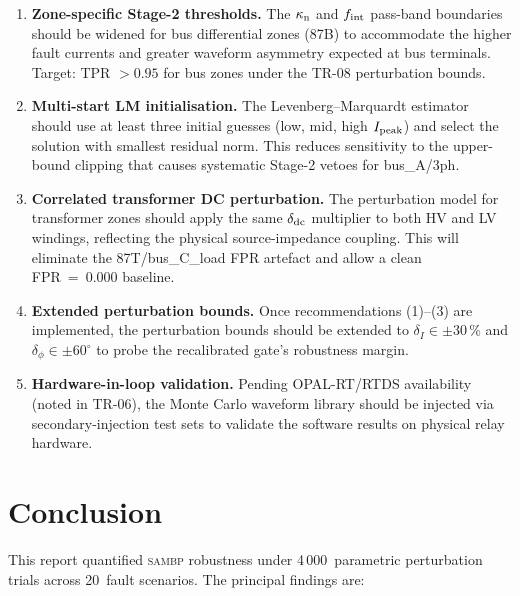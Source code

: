 \documentclass[12pt,a4paper]{article}
\newcommand{\SAMBP}{\textsc{sambp}}
\newcommand{\kappan}{\kappa_{\rm n}}
\newcommand{\fint}{f_{\rm int}}
\newcommand{\Ipeak}{I_{\rm peak}}
\begin{document}
\begin{enumerate}
  \item \textbf{Zone-specific Stage-2 thresholds.}
    The $\kappan$ and $\fint$ pass-band boundaries should be widened
    for bus differential zones (87B) to accommodate the higher fault
    currents and greater waveform asymmetry expected at bus terminals.
    Target: TPR $> 0.95$ for bus zones under the TR-08 perturbation
    bounds.

  \item \textbf{Multi-start LM initialisation.}
    The Levenberg--Marquardt estimator should use at least three initial
    guesses (low, mid, high $\Ipeak$) and select the solution with
    smallest residual norm.  This reduces sensitivity to the upper-bound
    clipping that causes systematic Stage-2 vetoes for bus\_A/3ph.

  \item \textbf{Correlated transformer DC perturbation.}
    The perturbation model for transformer zones should apply the same
    $\delta_{\rm dc}$ multiplier to both HV and LV windings, reflecting
    the physical source-impedance coupling.  This will eliminate the
    87T/bus\_C\_load FPR artefact and allow a clean FPR~=~0.000
    baseline.

  \item \textbf{Extended perturbation bounds.}
    Once recommendations (1)--(3) are implemented, the perturbation
    bounds should be extended to $\delta_I \in \pm30\,\%$ and
    $\delta_\phi \in \pm60^\circ$ to probe the recalibrated gate's
    robustness margin.

  \item \textbf{Hardware-in-loop validation.}
    Pending OPAL-RT/RTDS availability (noted in TR-06), the Monte Carlo
    waveform library should be injected via secondary-injection test sets
    to validate the software results on physical relay hardware.
\end{enumerate}


\section{Conclusion}

This report quantified \SAMBP{} robustness under 4\,000~parametric
perturbation trials across 20~fault scenarios.  The principal findings
are:
\end{document}
